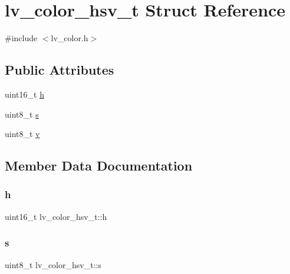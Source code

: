\hypertarget{structlv__color__hsv__t}{}\section{lv\+\_\+color\+\_\+hsv\+\_\+t Struct Reference}
\label{structlv__color__hsv__t}


{\ttfamily \#include $<$lv\+\_\+color.\+h$>$}

\subsection*{Public Attributes}
\begin{DoxyCompactItemize}
\item 
uint16\+\_\+t \mbox{\hyperlink{structlv__color__hsv__t_a953cf0eb0bd57da53b496b846b659a10}{h}}
\item 
uint8\+\_\+t \mbox{\hyperlink{structlv__color__hsv__t_ad95e4cc269ea11bf20f2e56e8dd92037}{s}}
\item 
uint8\+\_\+t \mbox{\hyperlink{structlv__color__hsv__t_aee68a0e7d6e57be412bc49a241cf02bf}{v}}
\end{DoxyCompactItemize}


\subsection{Member Data Documentation}
\mbox{\label{structlv__color__hsv__t_a953cf0eb0bd57da53b496b846b659a10}} 
\subsubsection{\texorpdfstring{h}{h}}
{\footnotesize\ttfamily uint16\+\_\+t lv\+\_\+color\+\_\+hsv\+\_\+t\+::h}

\mbox{\label{structlv__color__hsv__t_ad95e4cc269ea11bf20f2e56e8dd92037}} 
\subsubsection{\texorpdfstring{s}{s}}
{\footnotesize\ttfamily uint8\+\_\+t lv\+\_\+color\+\_\+hsv\+\_\+t\+::s}

\mbox{\label{structlv__color__hsv__t_aee68a0e7d6e57be412bc49a241cf02bf}} 
